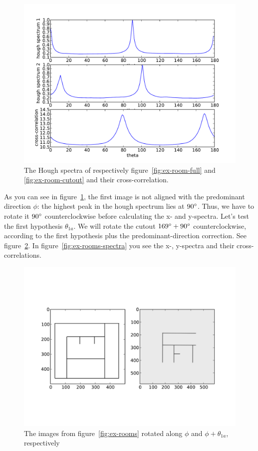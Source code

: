 \begin{figure}[ht]
	\centering
	\includegraphics[width=\textwidth]{images/stitching/rooms-ex-match-theta.pdf}
	\caption{The Hough spectra of respectively figure~\ref{fig:ex-room-full} and \ref{fig:ex-room-cutout} and their cross-correlation.}
	\label{fig:ex-rooms-theta}
\end{figure}

As you can see in figure~\ref{fig:ex-rooms-theta}, the first image is not aligned with the predominant direction $\phi$: the highest peak in the hough spectrum lies at $90\degree$. Thus, we have to rotate it $90\degree$ counterclockwise before calculating the x- and y-spectra. Let's test the first hypothesis $\theta_{1a}$. We will rotate the cutout $169\degree + 90 \degree$ counterclockwise, according to the first hypothesis plus the predominant-direction correction. See figure~\ref{fig:ex-rooms-rotated}. In figure~\ref{fig:ex-rooms-spectra} you see the x-, y-spectra and their cross-correlations. 

\begin{figure}[ht]
	\centering
	\includegraphics[width=\textwidth]{images/stitching/rooms-ex-rotated-crop.pdf}
	\caption{The images from figure~\ref{fig:ex-rooms} rotated along $\phi$ and $\phi + \theta_{1a}$, respectively}
	\label{fig:ex-rooms-rotated}
\end{figure}

